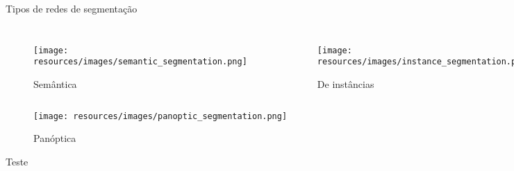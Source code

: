 \begin{frame}{Tipos de redes de segmentação}

    \begin{columns}

        \begin{figure}[h]
            \centering
            \texttt{[image: resources/images/semantic\_segmentation.png]}
            \captionsetup{labelformat=empty}
            \caption{Semântica}
        \end{figure}

        \begin{figure}[h]
            \centering
            \texttt{[image: resources/images/instance\_segmentation.png]}
            \captionsetup{labelformat=empty}
            \caption{De instâncias}
        \end{figure}
    \end{columns}
        \vspace{\fill}
        \vspace{-0.2cm}



        \begin{figure}[h]
            \centering
            \texttt{[image: resources/images/panoptic\_segmentation.png]}
            \captionsetup{labelformat=empty}
            \caption{Panóptica}
        \end{figure}

\end{frame}

\begin{frame}{Teste}
  \begin{figure}[h]
    \centering
\end{figure}

\end{frame}
